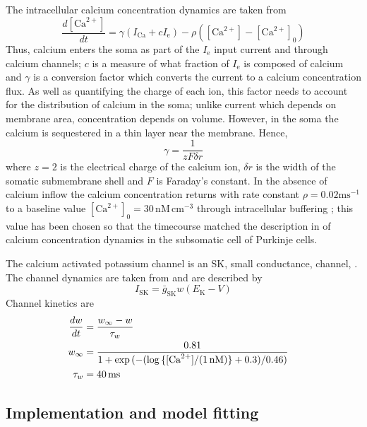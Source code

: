 \documentclass[twocolumn]{svjour3}          %
\newcommand{\mse}{\,\mathrm{ms}}
\newcommand{\cm}{\,\mathrm{cm}}
\renewcommand{\k}{\mathrm{K}}
\newcommand{\ca}{\mathrm{Ca}}
\newcommand{\sk}{\mathrm{SK}}
\begin{document}
The intracellular calcium concentration dynamics are taken from
\citet{SterrattEtAl2012,KochSegev1998}
\begin{equation}
\label{eq:ca_concentration}
\frac{d[\ca^{2+}]}{dt}=\gamma (I_\ca+cI_{\mathrm{e}})  -
\rho ([\ca^{2+}]-[\ca^{2+}]_0)
\end{equation}
Thus, calcium enters the soma as part of the $I_\mathrm{e}$ input
current and through calcium channels; $c$ is a measure of what
fraction of $I_{\mathrm{e}}$ is composed of calcium and $\gamma$ is a
conversion factor which converts the current to a calcium
concentration flux. As well as quantifying the charge of each ion,
this factor needs to account for the distribution of calcium in the
soma; unlike current which depends on membrane area, concentration
depends on volume. However, in the soma the calcium is sequestered in
a thin layer near the membrane. Hence,
\begin{equation}
\gamma=\frac{1}{zF\delta r} 
\end{equation}
where $z=2$ is the electrical charge of the
calcium ion, $\delta r$ is the width of the somatic
submembrane shell and $F$ is Faraday's constant. In the absence of
calcium inflow the calcium concentration returns with rate constant
$\rho=0.02\mathrm{ms}^{-1}$ to a baseline value $[\ca^{2+}]_0
=30\,\mathrm{nM}\cm^{-3}$ through intracellular buffering
\citep{FierroEtAl1998,AiraksinenEtAl1997}; this value has been chosen
so that the timecourse matched the description in
\citet{EilersEtAl1995} of calcium concentration dynamics in the
subsomatic cell of Purkinje cells.

The calcium activated potassium channel is an SK, small conductance,
channel, \citep{LancasterEtAl1991}. The channel dynamics are taken from
\citet{GilliesWillshaw2006} and are described by
\begin{equation}
\label{eq:I_SK}
I_{\sk} = {\bar{g}_{\sk}}w(E_\k-V)
\end{equation}
Channel kinetics are
\begin{align}
\label{eq:w_kinetics}
\frac{dw}{dt} &= \frac{w_\infty- w}{\tau_w}\cr
w_{\infty}   &= \frac{0.81}{1 + \exp{(-(\log{\{[\ca^{2+}]/(1\,\mathrm{nM})\}}+0.3)/0.46)}}\cr
\tau_w &= 40 \mse
\end{align}

\subsection{Implementation and model fitting}
\end{document}
